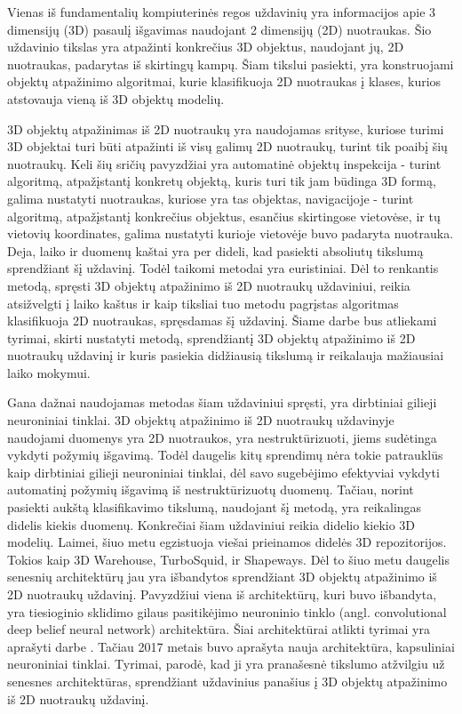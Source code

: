 
Vienas iš fundamentalių kompiuterinės regos uždavinių yra informacijos apie 3 dimensijų (3D) pasaulį išgavimas naudojant 2 dimensijų (2D) nuotraukas. Šio uždavinio tikslas yra atpažinti konkrečius 3D objektus, naudojant jų, 2D nuotraukas, padarytas iš skirtingų kampų. Šiam tikslui pasiekti, yra konstruojami objektų atpažinimo algoritmai, kurie klasifikuoja 2D nuotraukas į klases, kurios atstovauja vieną iš 3D objektų modelių.

3D objektų atpažinimas iš 2D nuotraukų yra naudojamas srityse, kuriose turimi 3D objektai turi būti atpažinti iš visų galimų 2D nuotraukų, turint tik poaibį šių nuotraukų. Keli šių sričių pavyzdžiai yra automatinė objektų inspekcija - turint algoritmą, atpažįstantį konkretų objektą, kuris turi tik jam būdinga 3D formą, galima nustatyti nuotraukas, kuriose yra tas objektas, navigacijoje - turint algoritmą, atpažįstantį konkrečius objektus, esančius skirtingose vietovėse, ir tų vietovių koordinates, galima nustatyti kurioje vietovėje buvo padaryta nuotrauka. Deja, laiko ir duomenų kaštai yra per dideli, kad pasiekti absoliutų tikslumą sprendžiant šį uždavinį. Todėl taikomi metodai yra euristiniai. Dėl to renkantis metodą, spręsti 3D objektų atpažinimo iš 2D nuotraukų uždaviniui, reikia atsižvelgti į laiko kaštus ir kaip tiksliai tuo metodu pagrįstas algoritmas klasifikuoja 2D nuotraukas, spręsdamas šį uždavinį. Šiame darbe bus atliekami tyrimai, skirti nustatyti metodą, sprendžiantį 3D objektų atpažinimo iš 2D nuotraukų uždavinį ir kuris pasiekia didžiausią tikslumą ir reikalauja mažiausiai laiko mokymui.

Gana dažnai naudojamas metodas šiam uždaviniui spręsti, yra dirbtiniai gilieji neuroniniai tinklai. 3D objektų atpažinimo iš 2D nuotraukų uždavinyje naudojami duomenys yra 2D nuotraukos, yra nestruktūrizuoti, jiems sudėtinga vykdyti požymių išgavimą. Todėl daugelis kitų sprendimų nėra tokie patrauklūs kaip dirbtiniai gilieji neuroniniai tinklai, dėl savo sugebėjimo efektyviai vykdyti automatinį požymių išgavimą iš nestruktūrizuotų duomenų. Tačiau, norint pasiekti aukštą klasifikavimo tikslumą, naudojant šį metodą, yra reikalingas didelis kiekis duomenų. Konkrečiai šiam uždaviniui reikia didelio kiekio 3D modelių. Laimei, šiuo metu egzistuoja viešai prieinamos didelės 3D repozitorijos. Tokios kaip 3D Warehouse, TurboSquid, ir Shapeways. Dėl to šiuo metu daugelis senesnių architektūrų jau yra išbandytos sprendžiant 3D objektų atpažinimo iš 2D nuotraukų uždavinį. Pavyzdžiui viena iš architektūrų, kuri buvo išbandyta, yra tiesioginio sklidimo gilaus pasitikėjimo neuroninio tinklo (angl. convolutional deep belief neural network) architektūra. Šiai architektūrai atlikti tyrimai yra aprašyti darbe \cite{dbnExp}. Tačiau 2017 metais buvo aprašyta nauja architektūra, kapsuliniai neuroniniai tinklai. Tyrimai, parodė, kad ji yra pranašesnė tikslumo atžvilgiu už senesnes architektūras, sprendžiant uždavinius panašius į 3D objektų atpažinimo iš 2D nuotraukų uždavinį.

